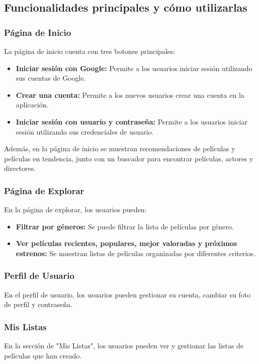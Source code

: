 \documentclass{article}
\begin{document}
    \subsection{Funcionalidades principales y cómo utilizarlas}

    \subsubsection{Página de Inicio}
    La página de inicio cuenta con tres botones principales:
    \begin{itemize}
        \item \textbf{Iniciar sesión con Google:} Permite a los usuarios iniciar sesión utilizando sus cuentas de Google.
        \item \textbf{Crear una cuenta:} Permite a los nuevos usuarios crear una cuenta en la aplicación.
        \item \textbf{Iniciar sesión con usuario y contraseña:} Permite a los usuarios iniciar sesión utilizando sus credenciales de usuario.
    \end{itemize}
    Además, en la página de inicio se muestran recomendaciones de películas y películas en tendencia, junto con un buscador para encontrar películas, actores y directores.

    \subsubsection{Página de Explorar}
    En la página de explorar, los usuarios pueden:
    \begin{itemize}
        \item \textbf{Filtrar por géneros:} Se puede filtrar la lista de películas por género.
        \item \textbf{Ver películas recientes, populares, mejor valoradas y próximos estrenos:} Se muestran listas de películas organizadas por diferentes criterios.
    \end{itemize}

    \subsubsection{Perfil de Usuario}
    En el perfil de usuario, los usuarios pueden gestionar su cuenta, cambiar su foto de perfil y contraseña.

    \subsubsection{Mis Listas}
    En la sección de "Mis Listas", los usuarios pueden ver y gestionar las listas de películas que han creado.
\end{document}
